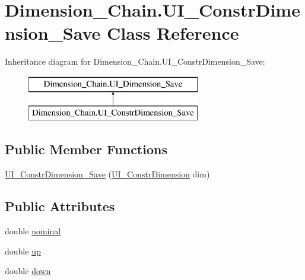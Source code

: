 \hypertarget{class_dimension___chain_1_1_u_i___constr_dimension___save}{}\section{Dimension\+\_\+\+Chain.\+U\+I\+\_\+\+Constr\+Dimension\+\_\+\+Save Class Reference}
\label{class_dimension___chain_1_1_u_i___constr_dimension___save}
Inheritance diagram for Dimension\+\_\+\+Chain.\+U\+I\+\_\+\+Constr\+Dimension\+\_\+\+Save\+:\begin{figure}[H]
\begin{center}
\leavevmode
\includegraphics[height=2.000000cm]{class_dimension___chain_1_1_u_i___constr_dimension___save}
\end{center}
\end{figure}
\subsection*{Public Member Functions}
\begin{DoxyCompactItemize}
\item 
\mbox{\hyperlink{class_dimension___chain_1_1_u_i___constr_dimension___save_a1c070c16eea1a24236aaf69e42bc5294}{U\+I\+\_\+\+Constr\+Dimension\+\_\+\+Save}} (\mbox{\hyperlink{class_dimension___chain_1_1_u_i___constr_dimension}{U\+I\+\_\+\+Constr\+Dimension}} dim)
\end{DoxyCompactItemize}
\subsection*{Public Attributes}
\begin{DoxyCompactItemize}
\item 
double \mbox{\hyperlink{class_dimension___chain_1_1_u_i___constr_dimension___save_a98e59e579076a0ac37836f972cedf3e2}{nominal}}
\item 
double \mbox{\hyperlink{class_dimension___chain_1_1_u_i___constr_dimension___save_aeba39bf37b5a6bdfc172e4597e1a868c}{up}}
\item 
double \mbox{\hyperlink{class_dimension___chain_1_1_u_i___constr_dimension___save_a616826bce06d95345b5e3bf096728cf3}{down}}
\end{DoxyCompactItemize}


